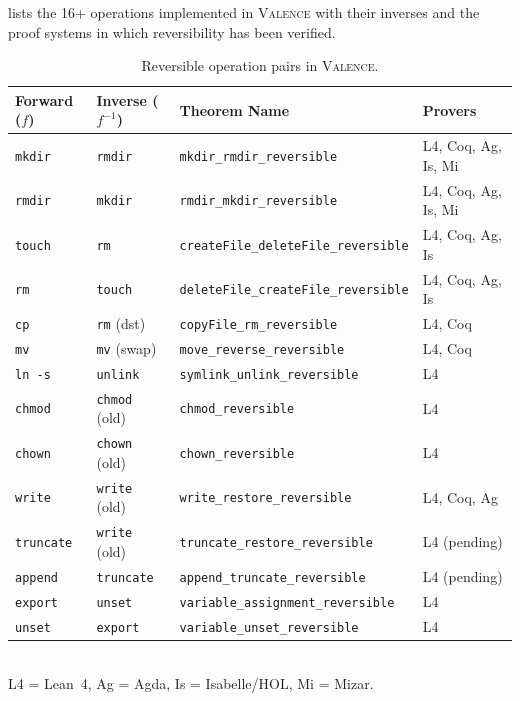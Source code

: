 \documentclass[11pt,a4paper]{article}
\newcommand{\inv}[1]{#1^{-1}}
\newcommand{\valence}{\textsc{Valence}}
\begin{document}
 lists the 16+ operations implemented in \valence{} with
their inverses and the proof systems in which reversibility has been verified.

\begin{table}[t]
\centering
\caption{Reversible operation pairs in \valence{}.}
\label{tab:operations}
\small
\begin{tabular}{@{}llll@{}}
\toprule
\textbf{Forward ($f$)} & \textbf{Inverse ($\inv{f}$)} &
\textbf{Theorem Name} & \textbf{Provers} \\
\midrule
\texttt{mkdir}     & \texttt{rmdir}     & \texttt{mkdir\_rmdir\_reversible}           & L4, Coq, Ag, Is, Mi \\
\texttt{rmdir}     & \texttt{mkdir}     & \texttt{rmdir\_mkdir\_reversible}           & L4, Coq, Ag, Is, Mi \\
\texttt{touch}     & \texttt{rm}        & \texttt{createFile\_deleteFile\_reversible} & L4, Coq, Ag, Is \\
\texttt{rm}        & \texttt{touch}     & \texttt{deleteFile\_createFile\_reversible} & L4, Coq, Ag, Is \\
\texttt{cp}        & \texttt{rm} (dst)  & \texttt{copyFile\_rm\_reversible}           & L4, Coq \\
\texttt{mv}        & \texttt{mv} (swap) & \texttt{move\_reverse\_reversible}          & L4, Coq \\
\texttt{ln -s}     & \texttt{unlink}    & \texttt{symlink\_unlink\_reversible}        & L4 \\
\texttt{chmod}     & \texttt{chmod} (old) & \texttt{chmod\_reversible}               & L4 \\
\texttt{chown}     & \texttt{chown} (old) & \texttt{chown\_reversible}               & L4 \\
\texttt{write}     & \texttt{write} (old) & \texttt{write\_restore\_reversible}       & L4, Coq, Ag \\
\texttt{truncate}  & \texttt{write} (old) & \texttt{truncate\_restore\_reversible}    & L4 (pending) \\
\texttt{append}    & \texttt{truncate}  & \texttt{append\_truncate\_reversible}       & L4 (pending) \\
\texttt{export}    & \texttt{unset}     & \texttt{variable\_assignment\_reversible}   & L4 \\
\texttt{unset}     & \texttt{export}    & \texttt{variable\_unset\_reversible}        & L4 \\
\bottomrule
\end{tabular}
\\[0.5em]
\footnotesize L4 = Lean~4, Ag = Agda, Is = Isabelle/HOL, Mi = Mizar.
\end{table}
\end{document}
